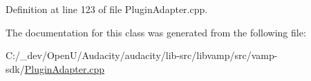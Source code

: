 Definition at line 123 of file Plugin\+Adapter.\+cpp.



The documentation for this class was generated from the following file\+:\begin{DoxyCompactItemize}
\item 
C\+:/\+\_\+dev/\+Open\+U/\+Audacity/audacity/lib-\/src/libvamp/src/vamp-\/sdk/\hyperlink{_plugin_adapter_8cpp}{Plugin\+Adapter.\+cpp}\end{DoxyCompactItemize}
